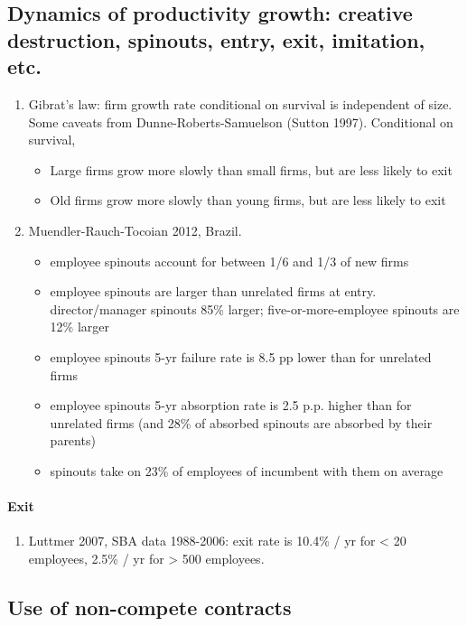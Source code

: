 \documentclass[12pt,english]{article}
\theoremstyle{remark}
\begin{document}
\subsection{Dynamics of productivity growth: creative destruction, spinouts, entry, exit, imitation, etc.}
\begin{enumerate}
	\item Gibrat's law: firm growth rate conditional on survival is independent of size. Some caveats from Dunne-Roberts-Samuelson (Sutton 1997). Conditional on survival, 
	\begin{itemize}
		\item Large firms grow more slowly than small firms, but are less likely to exit
		\item Old firms grow more slowly than young firms, but are less likely to exit
	\end{itemize}
	\item Muendler-Rauch-Tocoian 2012, Brazil.
	\begin{itemize}
		\item employee spinouts account for between 1/6 and 1/3 of new firms 
		\item employee spinouts are larger than unrelated firms at entry. director/manager spinouts 85\% larger; five-or-more-employee spinouts are 12\% larger
		\item employee spinouts 5-yr failure rate is 8.5 pp lower than for unrelated firms
		\item employee spinouts 5-yr absorption rate is 2.5 p.p. higher than for unrelated firms (and 28\% of absorbed spinouts are absorbed by their parents)
		\item spinouts take on 23\% of employees of incumbent with them on average
	\end{itemize} 
\end{enumerate}

\paragraph{Exit}
\begin{enumerate}
	\item Luttmer 2007, SBA data 1988-2006: exit rate is 10.4\% / yr for < 20 employees, 2.5\% / yr for > 500 employees.
\end{enumerate}

\subsection{Use of non-compete contracts}
\end{document}
